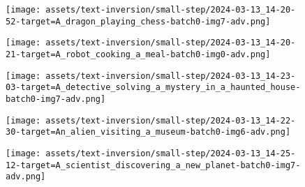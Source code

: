 \begin{figure*}[]
\vspace{1ex}
\begin{minipage}[t]{.025\textwidth}
     \vspace{0pt}
\end{minipage}%
\hspace{1ex}
\begin{minipage}[t]{0.98\textwidth}
    \vspace{0pt}
    \begin{subfigure}[t]{0.2\textwidth}
        \texttt{[image: assets/text-inversion/small-step/2024-03-13\_14-20-52-target=A\_dragon\_playing\_chess-batch0-img7-adv.png]}
    \end{subfigure}%
    \begin{subfigure}[t]{0.2\textwidth}
        \texttt{[image: assets/text-inversion/small-step/2024-03-13\_14-20-21-target=A\_robot\_cooking\_a\_meal-batch0-img0-adv.png]}
    \end{subfigure}%
    \begin{subfigure}[t]{0.2\textwidth}
        \texttt{[image: assets/text-inversion/small-step/2024-03-13\_14-23-03-target=A\_detective\_solving\_a\_mystery\_in\_a\_haunted\_house-batch0-img7-adv.png]}
    \end{subfigure}%
    \begin{subfigure}[t]{0.2\textwidth}
        \texttt{[image: assets/text-inversion/small-step/2024-03-13\_14-22-30-target=An\_alien\_visiting\_a\_museum-batch0-img6-adv.png]}
    \end{subfigure}%
    \begin{subfigure}[t]{0.2\textwidth}
        \texttt{[image: assets/text-inversion/small-step/2024-03-13\_14-25-12-target=A\_scientist\_discovering\_a\_new\_planet-batch0-img7-adv.png]}
    \end{subfigure}%
\end{minipage}




\end{figure*}
